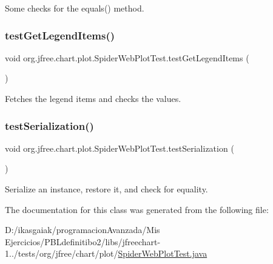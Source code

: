 Some checks for the equals() method. \mbox{\label{classorg_1_1jfree_1_1chart_1_1plot_1_1_spider_web_plot_test_a0d35e44d7cca5533104dd2b098b9669b}} 
\subsubsection{\texorpdfstring{test\+Get\+Legend\+Items()}{testGetLegendItems()}}
{\footnotesize\ttfamily void org.\+jfree.\+chart.\+plot.\+Spider\+Web\+Plot\+Test.\+test\+Get\+Legend\+Items (\begin{DoxyParamCaption}{ }\end{DoxyParamCaption})}

Fetches the legend items and checks the values. \mbox{\label{classorg_1_1jfree_1_1chart_1_1plot_1_1_spider_web_plot_test_ad89075b83b3285ad4e2eace909417cac}} 
\subsubsection{\texorpdfstring{test\+Serialization()}{testSerialization()}}
{\footnotesize\ttfamily void org.\+jfree.\+chart.\+plot.\+Spider\+Web\+Plot\+Test.\+test\+Serialization (\begin{DoxyParamCaption}{ }\end{DoxyParamCaption})}

Serialize an instance, restore it, and check for equality. 

The documentation for this class was generated from the following file\+:\begin{DoxyCompactItemize}
\item 
D\+:/ikasgaiak/programacion\+Avanzada/\+Mis Ejercicios/\+P\+B\+Ldefinitibo2/libs/jfreechart-\/1../tests/org/jfree/chart/plot/\mbox{\hyperlink{_spider_web_plot_test_8java}{Spider\+Web\+Plot\+Test.\+java}}\end{DoxyCompactItemize}
